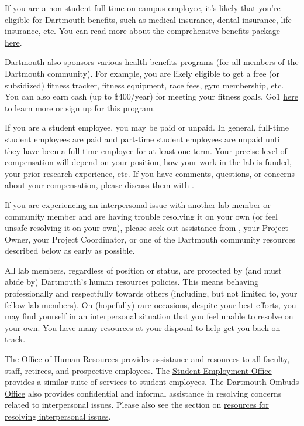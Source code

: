 \documentclass{tufte-book} %
\begin{document}

If you are a non-student full-time on-campus employee, it's likely
that you're eligible for Dartmouth benefits, such as medical
insurance, dental insurance, life insurance, etc.  You can read more
about the comprehensive benefits package
\href{http://www.dartmouth.edu/~hrs/benefits/}{here}.

Dartmouth also sponsors various health-benefits programs (for all
members of the Dartmouth community).  For example, you are likely
eligible to get a free (or subsidized) fitness tracker, fitness
equipment, race fees, gym membership, etc.  You can also earn cash (up
to \$400/year) for meeting your fitness goals.  Go1
\href{http://join.virginpulse.com/dartmouth/}{here} to learn more or
sign up for this program.

If you are a student employee, you may be paid or unpaid.  In general,
full-time student employees are paid and part-time student employees
are unpaid until they have been a full-time employee for at least one
term.  Your precise level of compensation will depend on your
position, how your work in the lab is funded, your prior research
experience, etc.  If you have comments, questions, or concerns about
your compensation, please discuss them with \director.


If you are experiencing an interpersonal issue with another lab member
or community member and are having trouble resolving it on your own
(or feel unsafe resolving it on your own), please seek out assistance
from \director, your Project Owner, your Project Coordinator, or one
of the Dartmouth community resources described below as early as
possible.

All lab members, regardless of position or status, are protected by
(and must abide by) Dartmouth's human resources policies.  This means
behaving professionally and respectfully towards others (including,
but not limited to, your fellow lab members).  On (hopefully) rare
occasions, despite your best efforts, you may find yourself in an
interpersonal situation that you feel unable to resolve on your own.
You have many resources at your disposal to help get you back on
track.

The \href{http://www.dartmouth.edu/~hrs/}{Office of Human Resources}
provides assistance and resources to all faculty, staff, retirees, and
prospective employees. The
\href{http://www.dartmouth.edu/~seo/}{Student Employment Office}
provides a similar suite of services to student employees.  The
\href{http://www.dartmouth.edu/~ombuds/}{Dartmouth Ombuds Office} also
provides confidential and informal assistance in resolving concerns
related to interpersonal issues.  Please also see the section on
\hyperref[sec:interpersonal]{resources for resolving interpersonal
  issues}.
\end{document}
